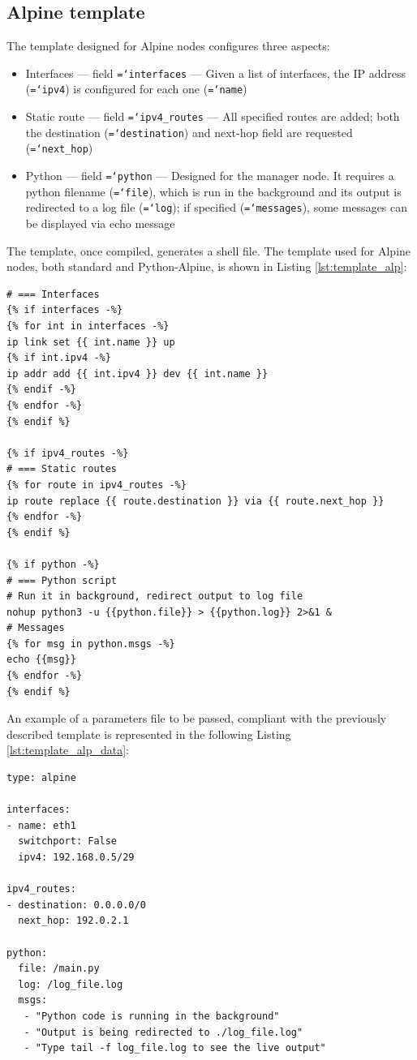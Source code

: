 \documentclass{report}
\newcommand{\monospaced}[1]{\texttt{\hyphenchar\font=`\-#1}}
\begin{document}
\subsection{Alpine template}\label{sec:template_alpine}
The template designed for Alpine nodes configures three aspects:
\begin{itemize}
    \item Interfaces --- field \monospaced{interfaces} --- Given a list of interfaces, the IP address (\monospaced{ipv4}) is configured for each one (\monospaced{name})
    \item Static route --- field \monospaced{ipv4\_routes} --- All specified routes are added; both the destination (\monospaced{destination}) and next-hop field are requested (\monospaced{next\_hop})
    \item Python --- field \monospaced{python} --- Designed for the manager node. It requires a python filename (\monospaced{file}), which is run in the background and its output is redirected to a log file (\monospaced{log}); if specified (\monospaced{messages}), some messages can be displayed via echo message
\end{itemize}
The template, once compiled, generates a shell file. The template used for Alpine nodes, both standard and Python-Alpine, is shown in Listing \ref{lst:template_alp}:
\begin{lstlisting}[style=styleJinja, caption=Alpine template, label=lst:template_alp]      
# === Interfaces
{% if interfaces -%}
{% for int in interfaces -%}
ip link set {{ int.name }} up
{% if int.ipv4 -%}
ip addr add {{ int.ipv4 }} dev {{ int.name }}
{% endif -%}
{% endfor -%}
{% endif %}

{% if ipv4_routes -%}
# === Static routes
{% for route in ipv4_routes -%}
ip route replace {{ route.destination }} via {{ route.next_hop }}
{% endfor -%}
{% endif %}

{% if python -%}
# === Python script
# Run it in background, redirect output to log file
nohup python3 -u {{python.file}} > {{python.log}} 2>&1 &
# Messages
{% for msg in python.msgs -%}
echo {{msg}}
{% endfor -%}
{% endif %}

\end{lstlisting}
An example of a parameters file to be passed, compliant with the previously described template is represented in the following Listing \ref{lst:template_alp_data}:
\begin{lstlisting}[style=styleYml, caption=Alpine parameters, label=lst:template_alp_data,
    morekeywords={type,interfaces,name,switchport,ipv4,python,file,log,msgs,ipv4_routes,destination,next_hop}]
type: alpine

interfaces:
- name: eth1
  switchport: False
  ipv4: 192.168.0.5/29

ipv4_routes:
- destination: 0.0.0.0/0
  next_hop: 192.0.2.1

python:
  file: /main.py
  log: /log_file.log
  msgs: 
   - "Python code is running in the background"
   - "Output is being redirected to ./log_file.log"
   - "Type tail -f log_file.log to see the live output"
\end{lstlisting}
\end{document}
